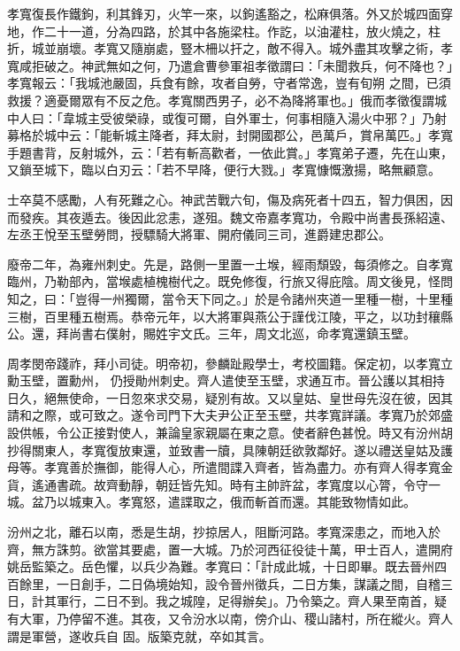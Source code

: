\begin{pinyinscope}
 孝寬復長作鐵鉤，利其鋒刃，火竿一來，以鉤遙豁之，松麻俱落。外又於城四面穿地，作二十一道，分為四路，於其中各施梁柱。作訖，以油灌柱，放火燒之，柱折，城並崩壞。孝寬又隨崩處，豎木柵以扞之，敵不得入。城外盡其攻擊之術，孝寬咸拒破之。神武無如之何，乃遣倉曹參軍祖孝徵謂曰：「未聞救兵，何不降也？」孝寬報云：「我城池嚴固，兵食有餘，攻者自勞，守者常逸，豈有旬朔
 之間，已須救援？適憂爾眾有不反之危。孝寬關西男子，必不為降將軍也。」俄而孝徵復謂城中人曰：「韋城主受彼榮祿，或復可爾，自外軍士，何事相隨入湯火中邪？」乃射募格於城中云：「能斬城主降者，拜太尉，封開國郡公，邑萬戶，賞帛萬匹。」孝寬手題書背，反射城外，云：「若有斬高歡者，一依此賞。」孝寬弟子遷，先在山東，又鎖至城下，臨以白刃云：「若不早降，便行大戮。」孝寬慷慨激揚，略無顧意。



 士卒莫不感勵，人有死難之心。神武苦戰六旬，傷及病死者十四五，智力俱困，因而發疾。其夜遁去。後因此忿恚，遂殂。魏文帝嘉孝寬功，令殿中尚書長孫紹遠、
 左丞王悅至玉壁勞問，授驃騎大將軍、開府儀同三司，進爵建忠郡公。



 廢帝二年，為雍州刺史。先是，路側一里置一土堠，經雨頹毀，每須修之。自孝寬臨州，乃勒部內，當堠處植槐樹代之。既免修復，行旅又得庇陰。周文後見，怪問知之，曰：「豈得一州獨爾，當令天下同之。」於是令諸州夾道一里種一樹，十里種三樹，百里種五樹焉。恭帝元年，以大將軍與燕公于謹伐江陵，平之，以功封穰縣公。還，拜尚書右僕射，賜姓宇文氏。三年，周文北巡，命孝寬還鎮玉壁。



 周孝閔帝踐祚，拜小司徒。明帝初，參麟趾殿學士，考校圖籍。保定初，以孝寬立勳玉壁，置勳州，
 仍授勛州刺史。齊人遣使至玉壁，求通互市。晉公護以其相持日久，絕無使命，一日忽來求交易，疑別有故。又以皇姑、皇世母先沒在彼，因其請和之際，或可致之。遂令司門下大夫尹公正至玉壁，共孝寬詳議。孝寬乃於郊盛設供帳，令公正接對使人，兼論皇家親屬在東之意。使者辭色甚悅。時又有汾州胡抄得關東人，孝寬復放東還，並致書一牘，具陳朝廷欲敦鄰好。遂以禮送皇姑及護母等。孝寬善於撫御，能得人心，所遣間諜入齊者，皆為盡力。亦有齊人得孝寬金貨，遙通書疏。故齊動靜，朝廷皆先知。時有主帥許盆，孝寬度以心膂，令守一
 城。盆乃以城東入。孝寬怒，遣諜取之，俄而斬首而還。其能致物情如此。



 汾州之北，離石以南，悉是生胡，抄掠居人，阻斷河路。孝寬深患之，而地入於齊，無方誅剪。欲當其要處，置一大城。乃於河西征役徒十萬，甲士百人，遣開府姚岳監築之。岳色懼，以兵少為難。孝寬曰：「計成此城，十日即畢。既去晉州四百餘里，一日創手，二日偽境始知，設令晉州徵兵，二日方集，謀議之間，自稽三日，計其軍行，二日不到。我之城隍，足得辦矣」。乃令築之。齊人果至南首，疑有大軍，乃停留不進。其夜，又令汾水以南，傍介山、稷山諸村，所在縱火。齊人謂是軍營，遂收兵自
 固。版築克就，卒如其言。




\end{pinyinscope}

